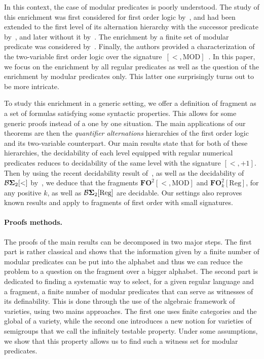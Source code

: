 \documentclass[submission,hidelink]{dmtcs-episciences}
\newcommand{\FO}{\mathbf{FO}}
\newcommand{\BS}{\mathbf{{\cal B}\Sigma}}
\newcommand{\Reg}{\mathrm{Reg}}
\newcommand{\MOD}{\mathrm{MOD}}
\begin{document}
	In this context, the case of modular predicates is poorly understood.
	The study of this enrichment
	was first considered for first order logic by~\cite{Bar92}, and had been extended to the first
	level of its alternation hierarchy with the successor predicate by~\cite{Pel92},
	and later without it by~\cite{CPS06b}.
		The enrichment by a finite set of modular predicate was considered by~\cite{EI03}.
	Finally, the authors
	provided a characterization of the two-variable first order logic over the signature~$[<,\MOD]$~\citep{DP13}.
In this paper, we focus on the enrichment by all regular predicates as well as the question of the enrichment
	by modular predicates only. This latter one surprisingly turns out to be more intricate.

	To study this enrichment in a generic setting, we offer a definition of fragment as a set of formulas satisfying some syntactic properties.
	This allows for some generic proofs instead of a one by one situation.
	The main applications of our theorems are then the \emph{quantifier alternations} hierarchies of the first order logic
	and its two-variable counterpart.
	Our main results state that for both of these hierarchies, the decidability of each level
	equipped with regular numerical predicates reduces to decidability of the same level with the signature $[<,+1]$.
	Then by using
	the recent decidability result of~\cite{KL13}, as well as the decidability of $\BS_2[<]$
	by~\cite{PZ14}, we deduce that the fragments $\FO^2[<,\MOD]$ and $\FO^2_k[\Reg]$, for any positive $k$, as well as $\BS_2[\Reg]$ are decidable.
	Our settings also reproves known results and apply to fragments of first order with small signatures.


	\paragraph{Proofs methods.}
	The proofs of the main results can be decomposed in two major steps.
	 The first part is rather classical and shows that the information given by a finite number of modular predicates can be put into the alphabet and thus we can reduce the problem to a question on the fragment over a bigger alphabet.
	The second part is dedicated to finding a systematic way to select,
	for a given regular language and a fragment, a finite number of
	modular predicates that can serve as witnesses of its definability.
This is done through the use of the algebraic
	framework of varieties, using two mains approaches.
	The first one uses finite categories and the global of a variety, while the second one
	introduces a new  notion for
	varieties of semigroups that we call the infinitely testable property.
	Under some assumptions, we show that this property
	allows us to find such a witness set for modular predicates.
\end{document}
